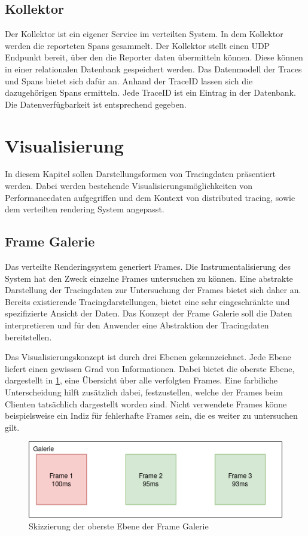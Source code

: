\subsection{Kollektor}
\label{subsection:Kollektor}
Der Kollektor ist ein eigener Service im verteilten System. In dem Kollektor werden die reporteten Spans gesammelt. Der Kollektor stellt einen UDP Endpunkt bereit, über den die Reporter daten übermitteln können. Diese können in einer relationalen Datenbank gespeichert werden. Das Datenmodell der Traces und Spans bietet sich dafür an. Anhand der TraceID lassen sich die dazugehörigen Spans ermitteln. Jede TraceID ist ein Eintrag in der Datenbank. Die Datenverfügbarkeit ist entsprechend gegeben.  

\section{Visualisierung}
\label{section:Visualisierung}
In diesem Kapitel sollen Darstellungsformen von Tracingdaten präsentiert werden. Dabei werden bestehende Visualisierungsmöglichkeiten von Performancedaten aufgegriffen und dem Kontext von distributed tracing, sowie dem verteilten rendering System angepasst.


\subsection{Frame Galerie}

Das verteilte Renderingsystem generiert Frames. Die Instrumentalisierung des System hat den Zweck einzelne Frames untersuchen zu können. Eine abstrakte Darstellung der Tracingdaten zur Untersuchung der Frames bietet sich daher an. Bereits existierende Tracingdarstellungen, bietet eine sehr eingeschränkte und spezifizierte Ansicht der Daten. Das Konzept der Frame Galerie soll die Daten interpretieren und für den Anwender eine Abstraktion der Tracingdaten bereitstellen. 

Das Visualisierungskonzept ist durch drei Ebenen gekennzeichnet. Jede Ebene liefert einen gewissen Grad von Informationen. Dabei bietet die oberste Ebene, dargestellt in \cref{fig:FrameGalerieObereEbene}, eine Übersicht über alle verfolgten Frames. Eine farbiliche Unterscheidung hilft zusätzlich dabei, festzustellen, welche der Frames beim Clienten tatsächlich dargestellt worden sind. Nicht verwendete Frames könne beispielsweise ein Indiz für fehlerhafte Frames sein, die es weiter zu untersuchen gilt.

\begin{figure}[!ht]
	\centering
	\includegraphics[scale=0.8]{img/Design/FrameGalerieObereEbene.png}
	\caption[Oberste Ebene der Frame Galerie]{ Skizzierung der oberste Ebene der Frame Galerie}
	\label{fig:FrameGalerieObereEbene}
\end{figure}

